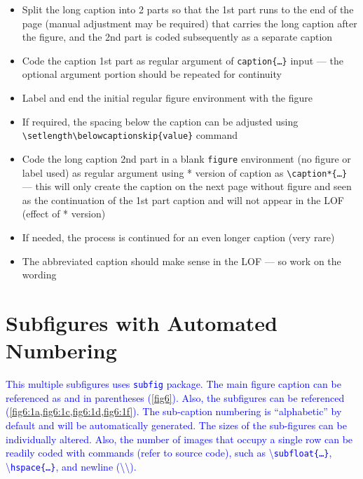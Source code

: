 \documentclass[phd,showframe]{ndsu-thesis-2022}
\newcommand\italk[1]{\textcolor{blue}{#1}}  %
\newcommand\cmd[1]{\textbackslash\texttt{#1}}  %
\begin{document}
\begin{itemize}
\item Split the long caption into 2 parts so that the 1st part runs to the end of the page (manual adjustment may be required) that carries the long caption after the figure, and the 2nd part is coded subsequently as a separate caption 
\item Code the caption 1st part as regular argument of \texttt{caption\{\ldots\}} input --- the optional argument portion should be repeated for continuity
\item Label and end the initial regular figure environment with the figure
\item If required, the spacing below the caption can be adjusted using \\\texttt{\textbackslash setlength\textbackslash belowcaptionskip\{value\}} command
\item Code the long caption 2nd part in a blank \texttt{figure} environment (no figure or label used) as regular argument using * version of caption as \texttt{\textbackslash caption*\{\ldots\}} --- this will only create the caption on the next page without figure and seen as the continuation of the 1st part caption and will not appear in the LOF (effect of * version)
\item If needed, the process is continued for an even longer caption (very rare)
\item The abbreviated caption should make sense in the LOF --- so work on the wording
\end{itemize}


\section{Subfigures with Automated Numbering}
 \italk{This multiple subfigures uses \texttt{subfig} package. The main figure caption can be referenced as \Cref{fig6} and in parentheses (\cref{fig6}). Also, the subfigures can be referenced (\cref{fig6:1a,fig6:1c,fig6:1d,fig6:1f}). The sub-caption numbering is ``alphabetic'' by default and will be automatically generated. The sizes of the sub-figures can be individually altered. Also, the number of images that occupy a single row can be readily coded with commands (refer to source code), such as \cmd{subfloat\{\ldots\}}, \cmd{hspace\{\ldots\}}, and newline (\textbackslash\textbackslash).} 
 
\end{document}
